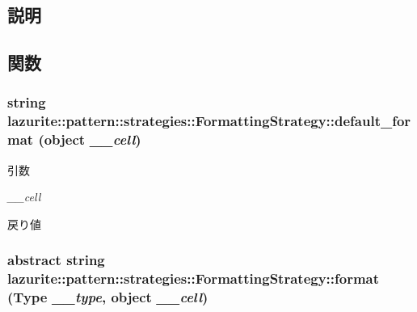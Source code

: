 \subsection{説明}


\subsection{関数}
\hypertarget{classlazurite_1_1pattern_1_1strategies_1_1_formatting_strategy_ad7862a1ac98c237e254d43af42c2cfae}{
\subsubsection[{default\_\-format}]{\setlength{\rightskip}{0pt plus 5cm}string lazurite::pattern::strategies::FormattingStrategy::default\_\-format (object {\em \_\-\_\-cell})}}
\label{classlazurite_1_1pattern_1_1strategies_1_1_formatting_strategy_ad7862a1ac98c237e254d43af42c2cfae}

\begin{DoxyParams}{引数}
\item[{\em \_\-\_\-cell}]\end{DoxyParams}
\begin{DoxyReturn}{戻り値}

\end{DoxyReturn}
\hypertarget{classlazurite_1_1pattern_1_1strategies_1_1_formatting_strategy_a40cd8d7e44cef54b232ef86bc0492847}{
\subsubsection[{format}]{\setlength{\rightskip}{0pt plus 5cm}abstract string lazurite::pattern::strategies::FormattingStrategy::format (Type {\em \_\-\_\-type}, \/  object {\em \_\-\_\-cell})}}
\label{classlazurite_1_1pattern_1_1strategies_1_1_formatting_strategy_a40cd8d7e44cef54b232ef86bc0492847}

